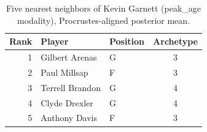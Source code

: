 \begin{table}[htbp]
  \centering\small
  \begin{tabular}{rllc}
    \toprule
    Rank & Player & Position & Archetype \\
    \midrule
    1 & Gilbert Arenas & G & 3 \\
    2 & Paul Millsap & F & 3 \\
    3 & Terrell Brandon & G & 4 \\
    4 & Clyde Drexler & G & 4 \\
    5 & Anthony Davis & F & 3 \\
    \bottomrule
  \end{tabular}
  \caption{Five nearest neighbors of Kevin Garnett (peak_age modality), Procrustes-aligned posterior mean.}
  \label{tab:Kevin_Garnett_neighbors_peak_age}
\end{table}

